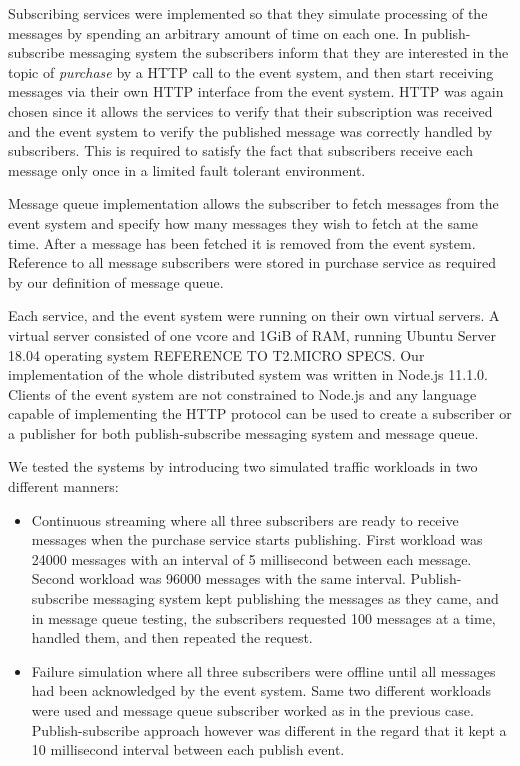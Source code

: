 \documentclass[conference]{IEEEtran}
\begin{document}
Subscribing services were implemented so that they simulate processing of the messages by spending an arbitrary amount of time on each one. In publish-subscribe messaging system the subscribers inform that they are interested in the topic of \textit{purchase} by a HTTP call to the event system, and then start receiving messages via their own HTTP interface from the event system. HTTP was again chosen since it allows the services to verify that their subscription was received and the event system to verify the published message was correctly handled by subscribers. This is required to satisfy the fact that subscribers receive each message only once in a limited fault tolerant environment.

Message queue implementation allows the subscriber to fetch messages from the event system and specify how many messages they wish to fetch at the same time. After a message has been fetched it is removed from the event system. Reference to all message subscribers were stored in purchase service as required by our definition of message queue.

Each service, and the event system were running on their own virtual servers. A virtual server consisted of one vcore and 1GiB of RAM, running Ubuntu Server 18.04 operating system REFERENCE TO T2.MICRO SPECS. Our implementation of the whole distributed system was written in Node.js 11.1.0. Clients of the event system are not constrained to Node.js and any language capable of implementing the HTTP protocol can be used to create a subscriber or a publisher for both publish-subscribe messaging system and message queue.

We tested the systems by introducing two simulated traffic workloads in two different manners:
\begin{itemize}
    \item Continuous streaming where all three subscribers are ready to receive messages when the purchase service starts publishing. First workload was 24000 messages with an interval of 5 millisecond between each message. Second workload was 96000 messages with the same interval. Publish-subscribe messaging system kept publishing the messages as they came, and in message queue testing, the subscribers requested 100 messages at a time, handled them, and then repeated the request.
    \item Failure simulation where all three subscribers were offline until all messages had been acknowledged by the event system. Same two different workloads were used and message queue subscriber worked as in the previous case. Publish-subscribe approach however was different in the regard that it kept a 10 millisecond interval between each publish event.
\end{itemize}
\end{document}
